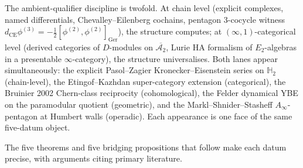 The ambient-qualifier discipline is twofold. At chain level
(explicit complexes, named differentials, Chevalley--Eilenberg cochains,
pentagon 3-cocycle witness $d_{\mathrm{CE}}\phi^{(3)} = -\frac{1}{2}[\phi^{(2)},\phi^{(2)}]_{\mathrm{Ger}}$),
the structure computes; at $(\infty,1)$-categorical level (derived
categories of $D$-modules on $\overline{\mathcal{A}_2}$, Lurie $\mathrm{HA}$
formalism of $E_2$-algebras in a presentable $\infty$-category), the structure
universalises. Both lanes appear simultaneously: the explicit Pasol--Zagier
Kronecker--Eisenstein series on $\mathbb{H}_2$ (chain-level), the
Etingof--Kazhdan super-category extension (categorical), the Bruinier 2002
Chern-class reciprocity (cohomological), the Felder dynamical YBE on the
paramodular quotient (geometric), and the Markl--Shnider--Stasheff
$A_\infty$-pentagon at Humbert walls (operadic). Each appearance is one face
of the same five-datum object.

The five theorems and five bridging propositions that follow make each datum
precise, with arguments citing primary literature.

